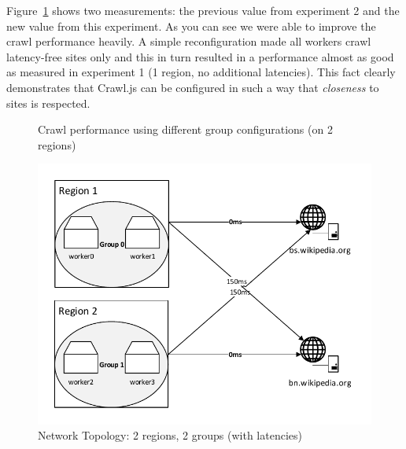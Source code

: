Figure~\ref{plot:exp_003} shows two measurements: the previous value from experiment 2 and the new value from this experiment. As you can see we were able to improve the crawl performance heavily. A simple reconfiguration made all workers crawl latency-free sites only and this in turn resulted in a performance almost as good as measured in experiment 1 (1 region, no additional latencies). This fact clearly demonstrates that Crawl.js can be configured in such a way that \emph{closeness} to sites is respected.
\begin{figure}
  \centering
  \caption{Crawl performance using different group configurations (on 2 regions)}
  \label{plot:exp_003}
\end{figure}

\begin{figure}[h]
\centering
  \includegraphics[width=1.0\textwidth]{Figures/topology_exp3.pdf}
  \caption{Network Topology: 2 regions, 2 groups (with latencies)}
\label{topology_exp3}
\end{figure}
